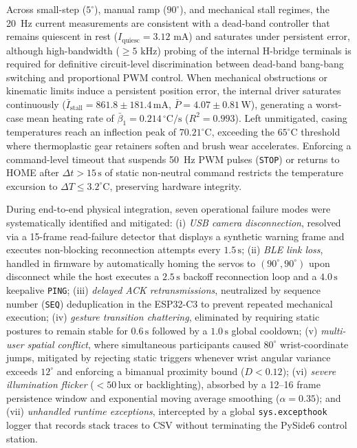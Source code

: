 \documentclass[lettersize,journal]{IEEEtran}
\begin{document}
	Across small-step ($5^\circ$), manual ramp ($90^\circ$),
	and mechanical stall regimes, the 20~Hz current measurements are consistent
	with a dead-band controller that remains quiescent in rest ($I_{\text{quiesc}} = 3.12\text{ mA}$)
	and saturates under persistent error, although high-bandwidth ($\ge 5\text{ kHz}$)
	probing of the internal H-bridge terminals is required for
	definitive circuit-level discrimination between dead-band bang-bang switching
	and proportional PWM control. When mechanical obstructions or
	kinematic limits induce a persistent position error, the internal driver
	saturates continuously ($\bar{I}_{\text{stall}} = 861.8 \pm 181.4\,\text{mA}$,
	$\bar{P} = 4.07 \pm 0.81\,\text{W}$), generating a worst-case mean heating
	rate of $\bar{\beta}_1 = 0.214\,^\circ\text{C/s}$ ($R^2 = 0.993$).
	Left unmitigated, casing temperatures reach an
	inflection peak of $70.21^\circ\text{C}$, exceeding the $65^\circ\text{C}$ threshold where
	thermoplastic gear retainers soften and brush wear accelerates. Enforcing a
	command-level timeout that suspends 50~Hz PWM pulses (\texttt{STOP}) or returns
	to HOME after $\Delta t > 15\,\text{s}$ of static non-neutral command
	restricts the temperature excursion to $\Delta T \le 3.2^\circ\text{C}$, preserving hardware integrity.
	
	During end-to-end physical integration, seven
	operational failure modes were systematically identified and mitigated:
	(i) \textit{USB camera disconnection}, resolved via a 15-frame read-failure
	detector that displays a synthetic warning frame and executes non-blocking
	reconnection attempts every $1.5\,\text{s}$; (ii) \textit{BLE link loss},
	handled in firmware by automatically homing the servos to $(90^\circ, 90^\circ)$
	upon disconnect while the host executes a $2.5\,\text{s}$ backoff reconnection
	loop and a $4.0\,\text{s}$ keepalive \texttt{PING}; (iii) \textit{delayed ACK
	retransmissions}, neutralized by sequence number (\texttt{SEQ}) deduplication
	in the ESP32-C3 to prevent repeated mechanical execution; (iv) \textit{gesture
	transition chattering}, eliminated by requiring static postures to remain
	stable for $0.6\,\text{s}$ followed by a $1.0\,\text{s}$ global cooldown;
	(v) \textit{multi-user spatial conflict}, where simultaneous participants
	caused $80^\circ$ wrist-coordinate jumps, mitigated by rejecting static
	triggers whenever wrist angular variance exceeds $12^\circ$ and enforcing a
	bimanual proximity bound ($D < 0.12$); (vi) \textit{severe illumination
	flicker} ($<50\,\text{lux}$ or backlighting), absorbed by a 12--16 frame
	persistence window and exponential moving average smoothing ($\alpha = 0.35$);
	and (vii) \textit{unhandled runtime exceptions}, intercepted by a global
	\texttt{sys.excepthook} logger that records stack traces to CSV without
	terminating the PySide6 control station.
	
\end{document}
